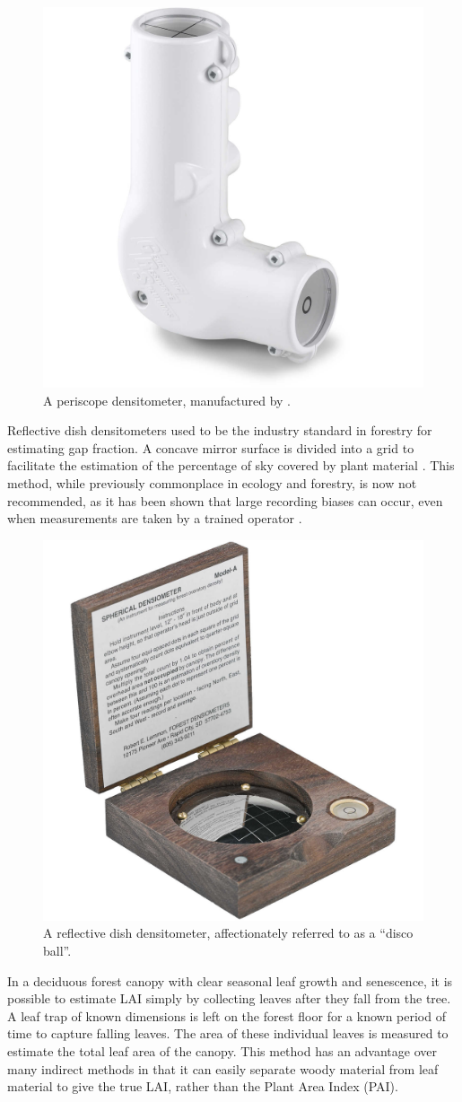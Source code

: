 \documentclass[11pt,a4paper]{article}
\begin{document}
\begin{figure}[H]
	\includegraphics[width=0.5\linewidth]{periscope_densitometer}
	\caption{A periscope densitometer, manufactured by \citet{GRS}.}
	\label{periscope_densitometer}
\end{figure}

Reflective dish densitometers used to be the industry standard in forestry for estimating gap fraction. A concave mirror surface is divided into a grid to facilitate the estimation of the percentage of sky covered by plant material \citep{Lemmon1956}. This method, while previously commonplace in ecology and forestry, is now not recommended, as it has been shown that large recording biases can occur, even when measurements are taken by a trained operator \citep{Korhonen2006}.

\begin{figure}[H]
	\includegraphics[width=0.5\linewidth]{disco_densitometer}
	\caption{A reflective dish densitometer, affectionately referred to as a ``disco ball''.}
	\label{disco_densitometer}
\end{figure}

In a deciduous forest canopy with clear seasonal leaf growth and senescence, it is possible to estimate LAI simply by collecting leaves after they fall from the tree. A leaf trap of known dimensions is left on the forest floor for a known period of time to capture falling leaves. The area of these individual leaves is measured to estimate the total leaf area of the canopy. This method has an advantage over many indirect methods in that it can easily separate woody material from leaf material to give the true LAI, rather than the Plant Area Index (PAI). 
\end{document}
